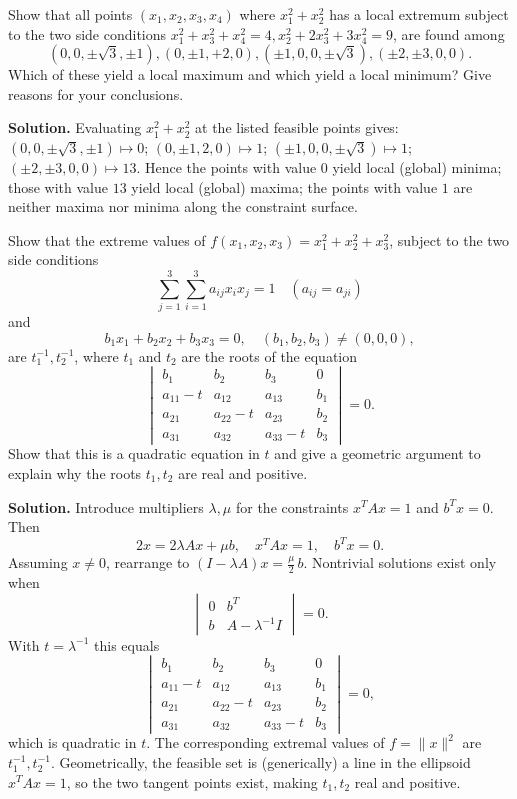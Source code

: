 \begin{problembox}
Show that all points \((x_1, x_2, x_3, x_4)\) where \(x_1^2 + x_2^2\) has a local extremum subject to the two side conditions \(x_1^2 + x_3^2 + x_4^2 = 4, x_2^2 + 2x_3^2 + 3x_4^2 = 9\), are found among 
\[ (0, 0, \pm \sqrt{3}, \pm 1), (0, \pm 1, +2, 0), (\pm 1, 0, 0, \pm \sqrt{3}), (\pm 2, \pm 3, 0, 0). \]
Which of these yield a local maximum and which yield a local minimum? Give reasons for your conclusions.
\end{problembox}

\noindent\textbf{Solution.}
Evaluating $x_1^2+x_2^2$ at the listed feasible points gives: $(0,0,\pm\sqrt3,\pm1)\mapsto 0$; $(0,\pm1,2,0)\mapsto 1$; $(\pm1,0,0,\pm\sqrt3)\mapsto 1$; $(\pm2,\pm3,0,0)\mapsto 13$. Hence the points with value $0$ yield local (global) minima; those with value $13$ yield local (global) maxima; the points with value $1$ are neither maxima nor minima along the constraint surface.

\begin{problembox}
Show that the extreme values of \(f(x_1, x_2, x_3) = x_1^2 + x_2^2 + x_3^2\), subject to the two side conditions
\[ \sum_{j=1}^3 \sum_{i=1}^3 a_{ij} x_i x_j = 1 \quad (a_{ij} = a_{ji}) \]
and
\[ b_1 x_1 + b_2 x_2 + b_3 x_3 = 0, \quad (b_1, b_2, b_3) \neq (0, 0, 0), \]
are \(t_1^{-1}, t_2^{-1}\), where \(t_1\) and \(t_2\) are the roots of the equation
\[\begin{vmatrix}
b_1 & b_2 & b_3 & 0 \\
a_{11} - t & a_{12} & a_{13} & b_1 \\
a_{21} & a_{22} - t & a_{23} & b_2 \\
a_{31} & a_{32} & a_{33} - t & b_3
\end{vmatrix} = 0.\]
Show that this is a quadratic equation in \(t\) and give a geometric argument to explain why the roots \(t_1, t_2\) are real and positive.
\end{problembox}

\noindent\textbf{Solution.}
Introduce multipliers $\lambda,\mu$ for the constraints $x^{\!T}Ax=1$ and $b^{\!T}x=0$. Then
\[2x=2\lambda Ax+\mu b,\quad x^{\!T}Ax=1,\quad b^{\!T}x=0.
\]
Assuming $x\neq 0$, rearrange to $(I-\lambda A)x=\tfrac{\mu}{2}\,b$. Nontrivial solutions exist only when
\[\begin{vmatrix}
0 & b^{\!T} \\
b & A-\lambda^{-1}I
\end{vmatrix}=0.
\]
With $t=\lambda^{-1}$ this equals
\[\begin{vmatrix}
b_1 & b_2 & b_3 & 0 \\
a_{11} - t & a_{12} & a_{13} & b_1 \\
a_{21} & a_{22} - t & a_{23} & b_2 \\
a_{31} & a_{32} & a_{33} - t & b_3
\end{vmatrix}=0,
\]
which is quadratic in $t$. The corresponding extremal values of $f=\|x\|^2$ are $t_1^{-1}, t_2^{-1}$. Geometrically, the feasible set is (generically) a line in the ellipsoid $x^{\!T}Ax=1$, so the two tangent points exist, making $t_1,t_2$ real and positive.

